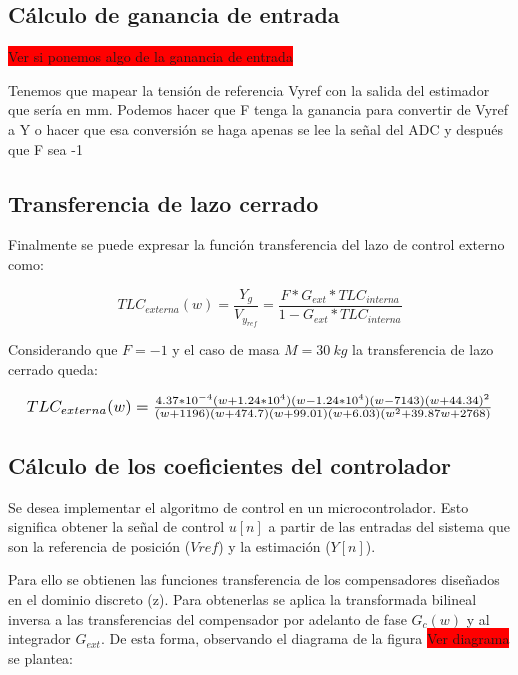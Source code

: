 \subsection{Cálculo de ganancia de entrada}

\colorbox{red}{Ver si ponemos algo de la ganancia de entrada}

Tenemos que mapear la tensión de referencia Vyref con la salida del estimador que sería en mm. Podemos hacer que F tenga la ganancia para convertir de Vyref a Y o hacer que esa conversión se haga apenas se lee la señal del ADC y después que F sea -1


\subsection{Transferencia de lazo cerrado}

Finalmente se puede expresar la función transferencia del lazo de control externo como:

\begin{equation}
	TLC_{externa}(w)=\frac{Y_g}{V_{y_{ref}}}=\frac{F*G_{ext}*TLC_{interna}}{1-G_{ext}*TLC_{interna}}
\end{equation}

Considerando que $F=-1$ y el caso de masa $M=30\:kg$ la transferencia de lazo cerrado queda:

\begin{equation*}
	\resizebox{.99\hsize}{!}
	{
		$
		TLC_{externa}(w)=\frac{4.37*10^{-4} (w+1.24*10^{4}) (w-1.24*10^{4}) (w-7143) (w+44.34)^2}{(w+1196) (w+474.7) (w+99.01) (w+6.03) (w^2 + 39.87w + 2768)}
		$
	}
\end{equation*}



\subsection{Cálculo de los coeficientes del controlador}


Se desea implementar el algoritmo de control en un microcontrolador. Esto significa obtener la señal de control $u[n]$ a partir de las entradas del sistema que son la referencia de posición ($Vref$) y la estimación ($Y[n]$). 

Para ello se obtienen las funciones transferencia de los compensadores diseñados en el dominio discreto (z). Para obtenerlas se aplica la transformada bilineal inversa a las transferencias del compensador por adelanto de fase $G_c(w)$ y al integrador $G_{ext}$. De esta forma, observando el diagrama de la figura \colorbox{red}{Ver diagrama} se plantea:

